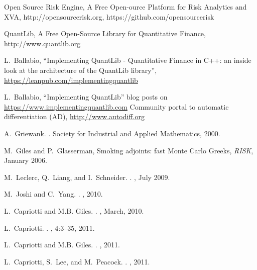 \documentclass[12pt, a4paper]{report}
\begin{document}
\begin{thebibliography}{*}

 Open Source Risk Engine, A Free Open-ource Platform for Risk Analytics and XVA, http://opensourcerisk.org, https://github.com/opensourcerisk

 QuantLib, A Free Open-Source Library for Quantitative Finance, http://www.quantlib.org

 L.~Ballabio, ``Implementing QuantLib - Quantitative Finance in C++: an inside look at the architecture of the QuantLib library'', \url{https://leanpub.com/implementingquantlib}

  L.~Ballabio, ``Implementing QuantLib'' blog posts on \url{https://www.implementingquantlib.com}
Community portal to automatic differentiation (AD),
\url{http://www.autodiff.org}

A.~Griewank.
.
\newblock Society for Industrial and Applied Mathematics, 2000.

 M.~Giles and P.~Glasserman,
Smoking adjoints: fast Monte Carlo Greeks, {\em RISK}, January 2006.

M.~Leclerc, Q.~Liang, and I.~Schneider.
.
, July 2009.

M.~Joshi and C.~Yang.
.
, 2010.

L.~Capriotti and M.B. Giles.
.
, March, 2010.

L.~Capriotti.
.
, 4:3--35, 2011.

L.~Capriotti and M.B. Giles.
.
, 2011.

L.~Capriotti, S.~Lee, and M.~Peacock.
.
, 2011.


\end{thebibliography}
\end{document}
